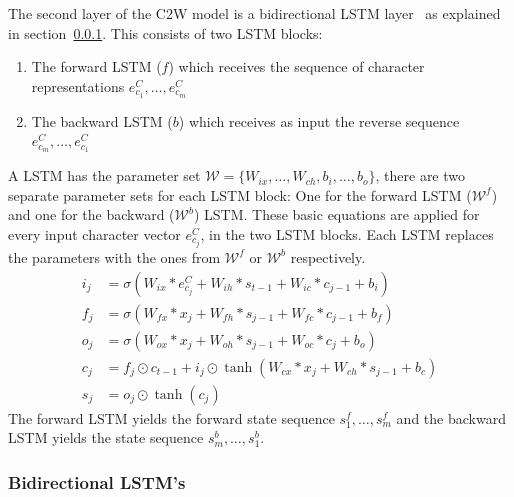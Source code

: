 The second layer of the C2W model is a bidirectional LSTM layer~\cite{DBLP:journals/nn/GravesS05} as explained in section~\ref{subsec:bidir-rnn}. 
This consists of two LSTM blocks:
\begin{enumerate}
  \item The forward LSTM ($f$) which receives the sequence of character representations $e_{c_1}^C, \dots, e_{c_m}^C$
  \item The backward LSTM ($b$) which receives as input the reverse sequence $e_{c_m}^C, \dots, e_{c_1}^C$
\end{enumerate}
A LSTM has the parameter set $\mathcal{W} = \{W_{ix},\dots,W_{ch},b_i,\dots,b_o\}$,
there are two separate parameter sets for each LSTM block: One for the forward LSTM ($\mathcal{W}^f$) and one for the backward ($\mathcal{W}^b$) LSTM.
These basic equations are applied for every input character vector $e_{c_j}^C$, in the two LSTM blocks. 
Each LSTM replaces the parameters with the ones from $\mathcal{W}^f$ or $\mathcal{W}^b$ respectively.
\begin{equation}
\begin{aligned}  
  i_j &=\sigma(W_{ix} * e_{c_j}^C  + W_{ih} * s_{t-1} + W_{ic} * c_{j-1} + b_i) \\  
  f_j &=\sigma(W_{fx} * x_j  + W_{fh} * s_{j-1} + W_{fc} * c_{j-1} + b_f) \\
  o_j &=\sigma(W_{ox} * x_j  + W_{oh} * s_{j-1} + W_{oc} * c_j + b_o) \\  
  c_j &= f_j \odot c_{t-1} + i_j \odot \tanh(W_{cx} * x_j  + W_{ch} * s_{j-1} + b_c) \\ 
  s_j &= o_j \odot \tanh(c_j) 
\end{aligned}
\end{equation}
The forward LSTM yields the forward state sequence $s_{1}^f, \dots, s_{m}^f$ and the backward LSTM yields the state sequence $s_{m}^b, \dots, s_{1}^b$.

\subsubsection{Bidirectional LSTM's}
\label{subsec:bidir-rnn}

